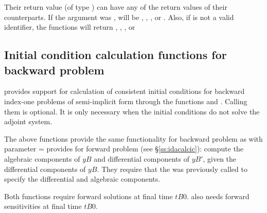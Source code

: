 Their return value  (of type ) can have any of the return values 
of their counterparts.
If the  argument was ,  will be
, , 
, or . Also, if  is not a
valid identifier, the functions will return , , 
, or 


\subsection{Initial condition calculation functions for backward problem}
\label{sss:idacalcicB}

{\idaa} provides support for calculation of consistent initial 
conditions for backward index-one problems of semi-implicit form through
the functions  and . Calling them is 
optional. It is only necessary when the initial conditions do not solve
the adjoint system. 

The above functions provide the same functionality for backward problem as 
 with parameter  =   
provides for forward problem (see \S\ref{ss:idacalcic}): compute the 
algebraic components of $yB$ and differential  components of $yB'$, given 
the differential components of $yB$.  They require that the 
was previously called to specify the differential and algebraic components.               


Both functions require forward solutions at final time $tB0$.  
also needs forward sensitivities at final time $tB0$.

